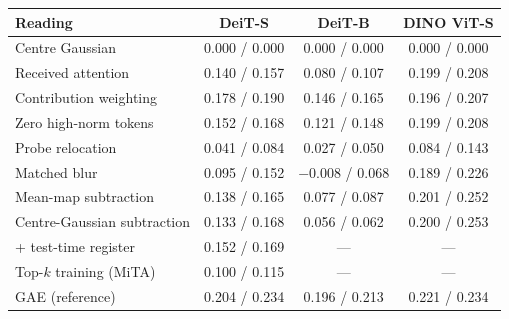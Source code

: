 \begin{tabular}{lccc}
\toprule
Reading & DeiT-S & DeiT-B & DINO ViT-S \\
\midrule
Centre Gaussian & 0.000 / 0.000 & 0.000 / 0.000 & 0.000 / 0.000 \\
Received attention & 0.140 / 0.157 & 0.080 / 0.107 & 0.199 / 0.208 \\
Contribution weighting & 0.178 / 0.190 & 0.146 / 0.165 & 0.196 / 0.207 \\
\quad Zero high-norm tokens & 0.152 / 0.168 & 0.121 / 0.148 & 0.199 / 0.208 \\
Probe relocation & 0.041 / 0.084 & 0.027 / 0.050 & 0.084 / 0.143 \\
\quad Matched blur & 0.095 / 0.152 & $-$0.008 / 0.068 & 0.189 / 0.226 \\
Mean-map subtraction & 0.138 / 0.165 & 0.077 / 0.087 & 0.201 / 0.252 \\
\quad Centre-Gaussian subtraction & 0.133 / 0.168 & 0.056 / 0.062 & 0.200 / 0.253 \\
+ test-time register & 0.152 / 0.169 & --- & --- \\
Top-$k$ training (MiTA) & 0.100 / 0.115 & --- & --- \\
GAE (reference) & 0.204 / 0.234 & 0.196 / 0.213 & 0.221 / 0.234 \\
\bottomrule
\end{tabular}
